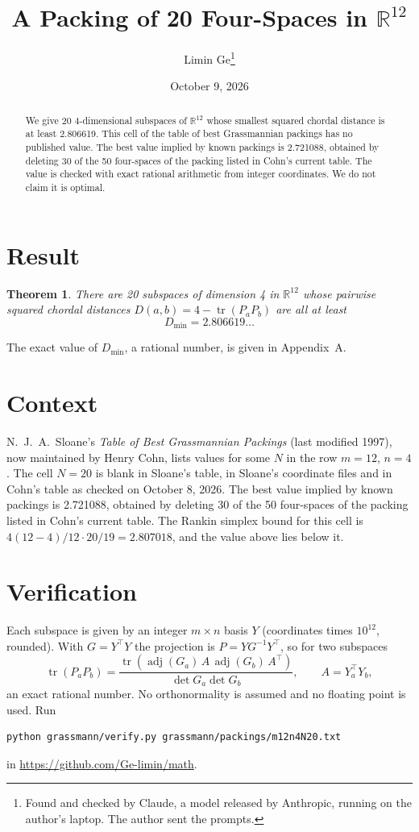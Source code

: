\documentclass[11pt,a4paper]{article}
\title{A Packing of 20 Four-Spaces in $\mathbb{R}^{12}$}
\author{Limin Ge\thanks{Found and checked by Claude, a model released by Anthropic, running on the author's laptop. The author sent the prompts.}}
\date{October 9, 2026}
\newtheorem*{theorem}{Theorem}
\begin{document}
\maketitle
\begin{abstract}
We give 20 4-dimensional subspaces of $\mathbb{R}^{12}$ whose smallest squared chordal distance is at least 2.806619. This cell of the table of best Grassmannian packings has no published value. The best value implied by known packings is 2.721088, obtained by deleting 30 of the 50 four-spaces of the packing listed in Cohn's current table. The value is checked with exact rational arithmetic from integer coordinates. We do not claim it is optimal.
\end{abstract}

\section{Result}
\begin{theorem}
There are 20 subspaces of dimension 4 in $\mathbb{R}^{12}$ whose pairwise squared chordal distances $D(a,b) = 4 - \operatorname{tr}(P_aP_b)$ are all at least
\[ D_{\min} = 2.806619\ldots \]
\end{theorem}
The exact value of $D_{\min}$, a rational number, is given in Appendix~A.


\section{Context}
N.~J.~A.~Sloane's \emph{Table of Best Grassmannian Packings} (last modified 1997), now maintained by Henry Cohn, lists values for some $N$ in the row $m=12$, $n=4$. The cell $N=20$ is blank in Sloane's table, in Sloane's coordinate files and in Cohn's table as checked on October 8, 2026. The best value implied by known packings is 2.721088, obtained by deleting 30 of the 50 four-spaces of the packing listed in Cohn's current table. The Rankin simplex bound for this cell is $4(12-4)/12\cdot 20/19 = 2.807018$, and the value above lies below it.


\section{Verification}
Each subspace is given by an integer $m\times n$ basis $Y$ (coordinates times $10^{12}$, rounded). With $G=Y^\top Y$ the projection is $P=YG^{-1}Y^\top$, so for two subspaces
\[ \operatorname{tr}(P_aP_b)=\frac{\operatorname{tr}(\operatorname{adj}(G_a)\,A\,\operatorname{adj}(G_b)\,A^\top)}{\det G_a\det G_b},\qquad A=Y_a^\top Y_b, \]
an exact rational number. No orthonormality is assumed and no floating point is used. Run
\begin{verbatim}
python grassmann/verify.py grassmann/packings/m12n4N20.txt
\end{verbatim}
in \url{https://github.com/Ge-limin/math}.
\end{document}
